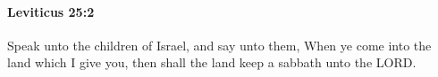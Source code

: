 
		\paragraph{Leviticus 25:2} %
			\label{LEVITICUS-25-2}

			Speak unto the children of Israel, and say unto them, When ye come into the land which I give you, then shall the land keep a sabbath unto the LORD.


